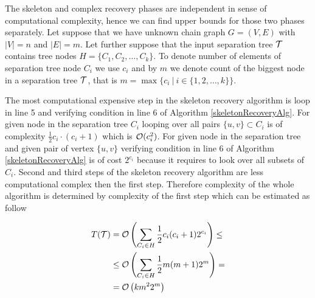 %
%



The skeleton and complex recovery phases are independent in sense of computational complexity, hence we can
find upper bounds for those two phases separately. 
Let suppose that we have unknown chain graph 
$G = (V, E)$ with $|V| = n$ and $|E| = m$. Let further suppose that the input separation tree $\mathcal{T}$ contains 
tree nodes
$H = \{ C_1, C_2, \dots, C_k \}$. To denote number of elements of separation tree node $C_i$ we use $c_i$ and by
$m$ we denote count of the biggest node in a separation tree $\mathcal{T}$, that is 
$m = \max \{ c_i \ | \ i \in \{1, 2, \dots, k \} \}$.

The most computational expensive step in the skeleton recovery algorithm is loop in line 5 and verifying 
condition in line 6 of Algorithm \ref{skeletonRecoveryAlg}. For given node in the separation tree $C_i$ looping over
all pairs $\{u, v\} \subset C_i$ is of complexity $\frac{1}{2} c_i \cdot (c_i + 1)$ which is $\mathcal{O}(c_i^2)$. For given node in the separation
tree and given pair of vertex $\{u, v\}$ verifying condition in line 6 of Algorithm \ref{skeletonRecoveryAlg} is of
cost $2^{c_i}$ because it requires to look over all subsets of $C_i$. Second and third steps of the skeleton
recovery algorithm are less computational complex then the first step. Therefore complexity of the whole algorithm 
is determined by complexity of the first step which can be estimated as follow


\begin{equation}
\begin{split}
	T(\mathcal{T}) & = \mathcal{O} \left( \sum_{C_i \in H} \frac{1}{2} c_i (c_i + 1) 2^{c_i} \right)  \le  \\
	&  \le \mathcal{O} \left( \sum_{C_i \in H} \frac{1}{2}m(m+1)2^{m} \right) =  \\
	& = \mathcal{O} \left( km^2 2^m \right)
\end{split}
\end{equation}






